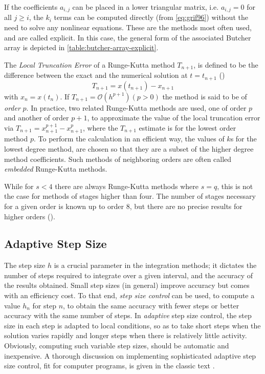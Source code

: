 If the coefficients $a_{i,j}$ can be placed in a lower triangular matrix, i.e. 
$a_{i,j} = 0$ for all $j \ge i$, the $k_i$ terms can be computed directly (from 
\autoref{eq:grif96}) without the need to solve any nonlinear equations. These are 
the methods most often used, and are called explicit. In this case, the general form 
of the associated Butcher array is depicted in \autoref{table:butcher-array-explicit}.

The \emph{Local Truncation Error} of a Runge-Kutta method $T_{n+1}$, is defined 
to be the difference between the exact and the numerical solution at $t=t_{n+1}$
(\cite{Griffiths2010})
\begin{equation}
    T_{n+1} = x(t_{n+1}) - x_{n+1}
\end{equation}
with $x_n = x(t_n)$. If $T_{n+1} = \mathcal{O}(h^{p+1})(p>0)$ the method is 
said to be of \emph{order} $p$. In practice, two related Runge-Kutta methods are 
used, one of order $p$ and another of order $p+1$, to approximate the value of 
the local truncation error via $T_{n+1} = x^{p+1}_{n+1} - x^{p}_{n+1}$, where the 
$T_{n+1}$ estimate is for the lowest order method $p$. To perform the calculation 
in an efficient way, the values of $k$s for the lowest degree method, are chosen 
so that they are a subset of the higher degree method coefficients. Such methods 
of neighboring orders are often called \emph{embedded} Runge-Kutta methods.

While for $s<4$ there are always Runge-Kutta methods where $s=q$, this is not the 
case for methods of stages higher than four. The number of stages necessary for 
a given order is known up to order 8, but there are no precise results for higher 
orders (\cite{Griffiths2010}).

\subsection{Adaptive Step Size}\label{ssec:adaptive-step-size}

The step size $h$ is a crucial parameter in the integration methods; it dictates 
the number of steps required to integrate over a given interval, and the accuracy 
of the results obtained. Small step sizes (in general) improve accuracy but comes 
with an efficiency cost. To that end, \emph{step size control} can be used, to 
compute a value $h_n$ for step $n$, to obtain the same accuracy with fewer steps 
or better accuracy with the same number of steps. In \emph{adaptive} step size control,
the step size in each step is adapted to local conditions, so as to take short steps 
when the solution varies rapidly and longer steps when there is relatively little 
activity. Obviously, computing such variable step sizes, should be automatic and 
inexpensive. A thorough discussion on implementing sophisticated adaptive step size 
control, fit for computer programs, is given in the classic text \cite{Shampine1975}.
